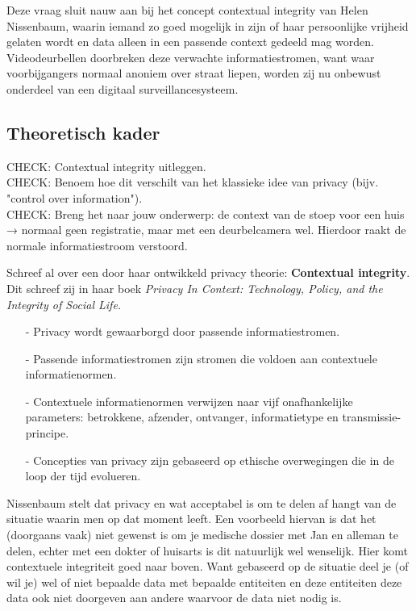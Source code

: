 \documentclass[nonacm, sigconf]{acmart}
\begin{document}

    Deze vraag sluit nauw aan bij het concept contextual integrity van Helen Nissenbaum, waarin iemand zo goed mogelijk in zijn of haar persoonlijke vrijheid gelaten wordt en data alleen in een passende context gedeeld mag worden.
    Videodeurbellen doorbreken deze verwachte informatiestromen, want waar voorbijgangers normaal anoniem over straat liepen, worden zij nu onbewust onderdeel van een digitaal surveillancesysteem.

    \subsection{Theoretisch kader}
    \begin{editorsonlyBox}
        CHECK: Contextual integrity uitleggen.\\
        CHECK: Benoem hoe dit verschilt van het klassieke idee van privacy (bijv. "control over information").\\
        CHECK: Breng het naar jouw onderwerp: de context van de stoep voor een huis → normaal geen registratie, maar met een deurbelcamera wel. Hierdoor raakt de normale informatiestroom verstoord.
    \end{editorsonlyBox}

    \parencite{nissenbaum2009privacy} Schreef al over een door haar ontwikkeld privacy theorie: \textbf{Contextual integrity}.
    Dit schreef zij in haar boek \textit{Privacy In Context: Technology, Policy, and the Integrity of Social Life.}

    \vertspace
    \begin{itemize}[leftmargin = *,listparindent =1cm]
        \item[-] Privacy wordt gewaarborgd door passende informatiestromen.
        \item[-] Passende informatiestromen zijn stromen die voldoen aan contextuele informatienormen.
        \item[-] Contextuele informatienormen verwijzen naar vijf onafhankelijke parameters: betrokkene, afzender, ontvanger, informatietype en transmissie-principe.
        \item[-] Concepties van privacy zijn gebaseerd op ethische overwegingen die in de loop der tijd evolueren.
    \end{itemize}
    \vertspace

    Nissenbaum stelt dat privacy en wat acceptabel is om te delen af hangt van de situatie waarin men op dat moment leeft.
    Een voorbeeld hiervan is dat het (doorgaans vaak) niet gewenst is om je medische dossier met Jan en alleman te delen, echter met een dokter of huisarts is dit natuurlijk wel wenselijk.
    Hier komt contextuele integriteit goed naar boven.
    Want gebaseerd op de situatie deel je (of wil je) wel of niet bepaalde data met bepaalde entiteiten en deze entiteiten deze data ook niet doorgeven aan andere waarvoor de data niet nodig is.
\end{document}
